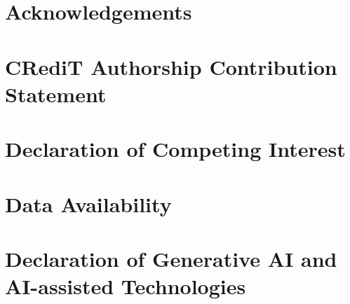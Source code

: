 \section*{Acknowledgements}



\section*{CRediT Authorship Contribution Statement}

%


\section*{Declaration of Competing Interest}



\section*{Data Availability}



\section*{Declaration of Generative AI and AI-assisted Technologies}

